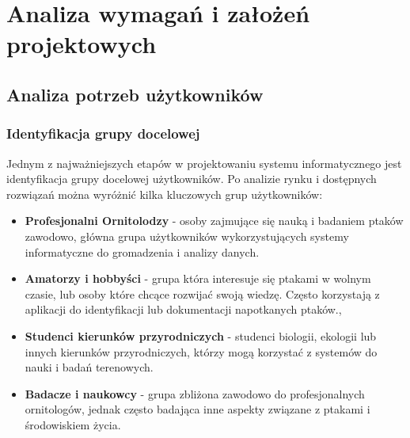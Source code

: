 %


\chapter{Analiza wymagań i założeń projektowych}
\label{rozdzial1}

\section{Analiza potrzeb użytkowników}

\subsection{Identyfikacja grupy docelowej}

Jednym z najważniejszych etapów w projektowaniu systemu informatycznego jest identyfikacja grupy docelowej użytkowników.
Po analizie rynku i dostępnych rozwiązań można wyróżnić kilka kluczowych grup użytkowników:
\begin{itemize}
	\item \textbf{Profesjonalni Ornitolodzy} - osoby zajmujące się nauką i badaniem ptaków zawodowo, główna grupa użytkowników wykorzystujących systemy informatyczne do gromadzenia i analizy danych.
	\item \textbf{Amatorzy i hobbyści} - grupa która interesuje się ptakami w wolnym czasie, lub osoby które chcące rozwijać swoją wiedzę. Często korzystają z aplikacji do identyfikacji lub dokumentacji napotkanych ptaków.,
	\item \textbf{Studenci kierunków przyrodniczych} - studenci biologii, ekologii lub innych kierunków przyrodniczych, którzy mogą korzystać z systemów do nauki i badań terenowych.
	\item \textbf{Badacze i naukowcy} - grupa zbliżona zawodowo do profesjonalnych ornitologów, jednak często badająca inne aspekty związane z ptakami i środowiskiem życia.
\end{itemize}

